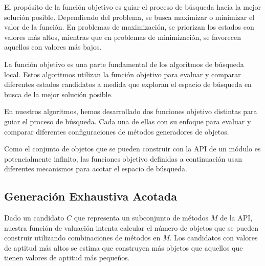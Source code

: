 El propósito de la función objetivo es guiar el proceso de búsqueda hacia la mejor solución posible. Dependiendo del problema, se busca maximizar o minimizar el valor de la función. En problemas de maximización, se priorizan los estados con valores más altos, mientras que en problemas de minimización, se favorecen aquellos con valores más bajos.

La función objetivo es una parte fundamental de los algoritmos de búsqueda local. Estos algoritmos utilizan la función objetivo para evaluar y comparar diferentes estados candidatos a medida que exploran el espacio de búsqueda en busca de la mejor solución posible.

En nuestros algoritmos, hemos desarrollado dos funciones objetivo distintas para guiar el proceso de búsqueda. 
Cada una de ellas con su enfoque para evaluar y comparar diferentes configuraciones de métodos generadores de objetos.

Como el conjunto de objetos que se pueden construir con la API de un módulo es potencialmente infinito, las funciones objetivo definidas a continuación usan diferentes mecanismos para acotar el espacio de búsqueda.


\subsection{Generación Exhaustiva Acotada}
\label{sec:fitnessGE}

Dado un candidato $C$ que representa un subconjunto de métodos $M$ de la API, 
nuestra función de valuación intenta calcular el número de objetos que se pueden construir utilizando combinaciones de métodos en $M$. 
Los candidatos con valores de aptitud más altos se estima que construyen más objetos que aquellos que tienen valores de aptitud más pequeños.

